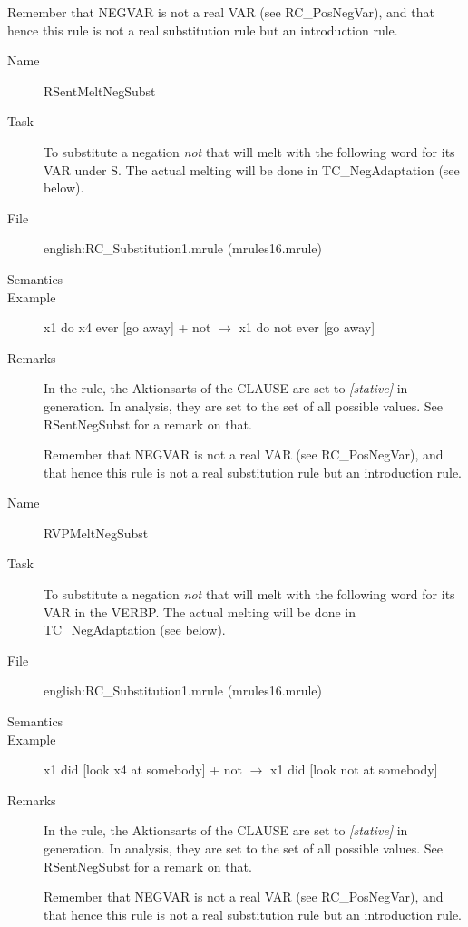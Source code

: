 \begin{description}
\begin{description}
Remember that NEGVAR is not a real VAR (see RC\_PosNegVar), and 
that hence this rule is not a real substitution rule but an introduction rule.
\end{description}

\vspace{1 cm}
\begin{description}
\item[Name] RSentMeltNegSubst
\item[Task] To substitute a negation {\em not\/} that will melt with the 
following word for its VAR under S. The actual melting will be done in 
TC\_NegAdaptation (see below).
\item[File] english:RC\_Substitution1.mrule (mrules16.mrule)
\item[Semantics]
\item[Example] x1 do x4 ever [go away] + not $\rightarrow$ x1 do not ever [go 
away]
\item[Remarks] In the rule, the Aktionsarts of the CLAUSE are set to {\em 
[stative]\/} in generation. In analysis, they are set to the 
set of all possible values. See RSentNegSubst for a remark on that.

Remember that NEGVAR is not a real VAR (see RC\_PosNegVar), and 
that hence this rule is not a real substitution rule but an introduction rule.
\end{description}

\vspace{1 cm}
\begin{description}
\item[Name] RVPMeltNegSubst
\item[Task] To substitute a negation {\em not\/} that will melt with the 
following word for its VAR in the VERBP. The actual melting will be done in 
TC\_NegAdaptation (see below).
\item[File] english:RC\_Substitution1.mrule (mrules16.mrule)
\item[Semantics]
\item[Example] x1 did [look x4 at somebody] + not $\rightarrow$ x1 did [look 
not at somebody]
\item[Remarks] In the rule, the Aktionsarts of the CLAUSE are set to {\em 
[stative]\/} in generation. In analysis, they are set to the 
set of all possible values. See RSentNegSubst for a remark on that.

Remember that NEGVAR is not a real VAR (see RC\_PosNegVar), and 
that hence this rule is not a real substitution rule but an introduction rule.
\end{description}


\end{description}
